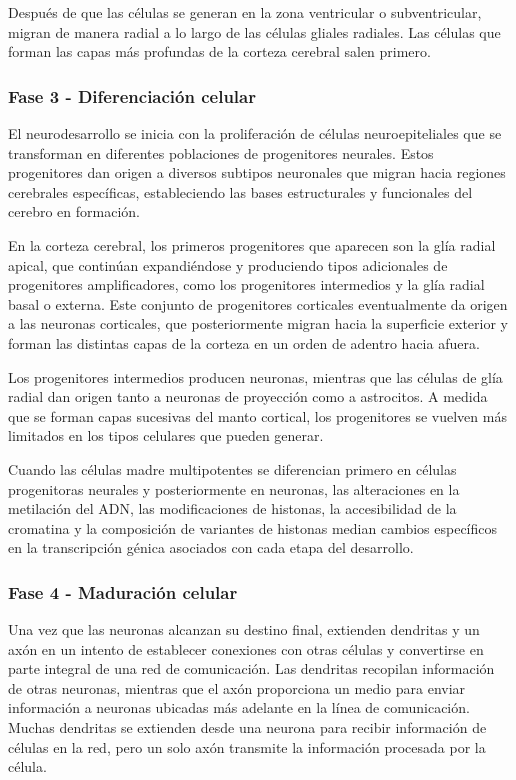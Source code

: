 \documentclass[11pt,letterpaper]{report}
\begin{document}
Después de que las células se generan en la zona ventricular o subventricular,
migran de manera radial a lo largo de las células gliales radiales. Las células
que forman las capas más profundas de la corteza cerebral salen primero. 
\cite{Polin124}

\subsubsection{Fase 3 - Diferenciación celular}
El neurodesarrollo se inicia con la proliferación de células neuroepiteliales
que se transforman en diferentes poblaciones de progenitores neurales. Estos
progenitores dan origen a diversos subtipos neuronales que migran hacia
regiones cerebrales específicas, estableciendo las bases estructurales y
funcionales del cerebro en formación. \cite{Lindhout2024}

En la corteza cerebral, los primeros progenitores que aparecen son la glía
radial apical, que continúan expandiéndose y produciendo tipos adicionales de
progenitores amplificadores, como los progenitores intermedios y la glía radial
basal o externa. Este conjunto de progenitores corticales eventualmente da
origen a las neuronas corticales, que posteriormente migran hacia la superficie
exterior y forman las distintas capas de la corteza en un orden de adentro
hacia afuera. \cite{Lindhout2024}

Los progenitores intermedios producen neuronas, mientras que las células de
glía radial dan origen tanto a neuronas de proyección como a astrocitos. A
medida que se forman capas sucesivas del manto cortical, los progenitores se
vuelven más limitados en los tipos celulares que pueden generar.
\cite{Lindhout2024}

Cuando las células madre multipotentes se diferencian primero en células
progenitoras neurales y posteriormente en neuronas, las alteraciones en la
metilación del ADN, las modificaciones de histonas, la accesibilidad de la
cromatina y la composición de variantes de histonas median cambios específicos
en la transcripción génica asociados con cada etapa del desarrollo.
\cite{Lindhout2024}

\subsubsection{Fase 4 - Maduración celular}
Una vez que las neuronas alcanzan su destino final, extienden dendritas y un
axón en un intento de establecer conexiones con otras células y convertirse en
parte integral de una red de comunicación. Las dendritas recopilan información
de otras neuronas, mientras que el axón proporciona un medio para enviar
información a neuronas ubicadas más adelante en la línea de comunicación.
Muchas dendritas se extienden desde una neurona para recibir información de
células en la red, pero un solo axón transmite la información procesada por la
célula. \cite{Gibb2018}
\end{document}
